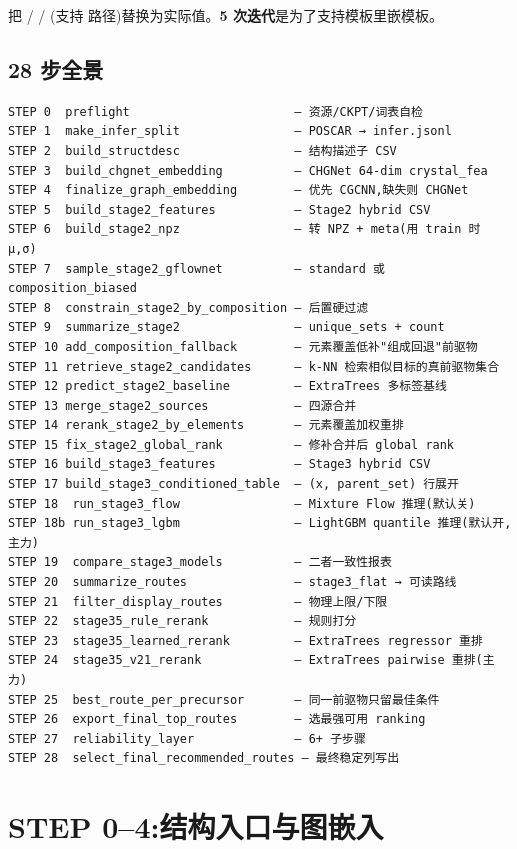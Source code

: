  把  /  / (支持  路径)替换为实际值。\textbf{5 次迭代}是为了支持模板里嵌模板。

\subsection{28 步全景}

\begin{lstlisting}
STEP 0  preflight                       — 资源/CKPT/词表自检
STEP 1  make_infer_split                — POSCAR → infer.jsonl
STEP 2  build_structdesc                — 结构描述子 CSV
STEP 3  build_chgnet_embedding          — CHGNet 64-dim crystal_fea
STEP 4  finalize_graph_embedding        — 优先 CGCNN,缺失则 CHGNet
STEP 5  build_stage2_features           — Stage2 hybrid CSV
STEP 6  build_stage2_npz                — 转 NPZ + meta(用 train 时 μ,σ)
STEP 7  sample_stage2_gflownet          — standard 或 composition_biased
STEP 8  constrain_stage2_by_composition — 后置硬过滤
STEP 9  summarize_stage2                — unique_sets + count
STEP 10 add_composition_fallback        — 元素覆盖低补"组成回退"前驱物
STEP 11 retrieve_stage2_candidates      — k-NN 检索相似目标的真前驱物集合
STEP 12 predict_stage2_baseline         — ExtraTrees 多标签基线
STEP 13 merge_stage2_sources            — 四源合并
STEP 14 rerank_stage2_by_elements       — 元素覆盖加权重排
STEP 15 fix_stage2_global_rank          — 修补合并后 global rank
STEP 16 build_stage3_features           — Stage3 hybrid CSV
STEP 17 build_stage3_conditioned_table  — (x, parent_set) 行展开
STEP 18  run_stage3_flow                — Mixture Flow 推理(默认关)
STEP 18b run_stage3_lgbm                — LightGBM quantile 推理(默认开,主力)
STEP 19  compare_stage3_models          — 二者一致性报表
STEP 20  summarize_routes               — stage3_flat → 可读路线
STEP 21  filter_display_routes          — 物理上限/下限
STEP 22  stage35_rule_rerank            — 规则打分
STEP 23  stage35_learned_rerank         — ExtraTrees regressor 重排
STEP 24  stage35_v21_rerank             — ExtraTrees pairwise 重排(主力)
STEP 25  best_route_per_precursor       — 同一前驱物只留最佳条件
STEP 26  export_final_top_routes        — 选最强可用 ranking
STEP 27  reliability_layer              — 6+ 子步骤
STEP 28  select_final_recommended_routes — 最终稳定列写出
\end{lstlisting}

\section{STEP 0--4:结构入口与图嵌入}

